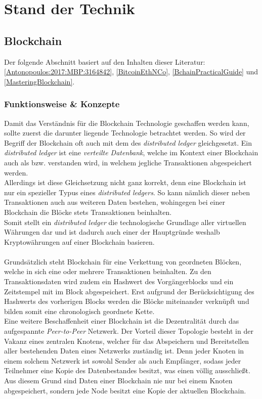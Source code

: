 \chapter{Stand der Technik}
\label{kap:Kapitel02}
%
       
%
\section{Blockchain}
Der folgende Abschnitt basiert auf den Inhalten dieser Literatur: \ref{Antonopoulos:2017:MBP:3164842}, \ref{BitcoinEthNCo}, \ref{BchainPracticalGuide} und \ref{MasteringBlockchain}. 

\subsection{Funktionsweise \& Konzepte}
Damit das Verständnis für die Blockchain Technologie geschaffen werden kann, sollte zuerst die darunter liegende Technologie betrachtet werden. 
So wird der Begriff der Blockchain oft auch mit dem des \textit{distributed ledger} gleichgesetzt. Ein \textit{distributed ledger} ist eine \textit{verteilte Datenbank}, welche im Kontext einer Blockchain auch als  bzw.  \cite{DL:bafin} verstanden wird, in welchem jegliche Transaktionen abgespeichert werden.\\
Allerdings ist diese Gleichsetzung nicht ganz korrekt, denn eine Blockchain ist nur ein spezieller Typus eines \textit{distributed ledgers}. So kann nämlich dieser neben Transaktionen auch aus weiteren Daten bestehen, wohingegen bei einer Blockchain die Blöcke stets Transaktionen beinhalten. \\
Somit stellt ein \textit{distributed ledger} die technologische Grundlage aller virtuellen Währungen dar und ist dadurch auch einer der Hauptgründe weshalb Kryptowährungen auf einer Blockchain basieren.\\\\
Grundsätzlich steht Blockchain für eine Verkettung von geordneten Blöcken, welche in sich eine oder mehrere Transaktionen beinhalten. 
Zu den Transaktionsdaten wird zudem ein Hashwert des Vorgängerblocks und ein Zeitstempel mit im Block abgespeichert. Erst aufgrund der Berücksichtigung des Hashwerts des vorherigen Blocks werden die Blöcke miteinander verknüpft und bilden somit eine chronologisch geordnete Kette.\\
Eine weitere Beschaffenheit einer Blockchain ist die Dezentralität durch das aufgespannte \textit{Peer-to-Peer} Netzwerk. Der Vorteil dieser Topologie besteht in der Vakanz eines zentralen Knotens, welcher für das Abspeichern und Bereitstellen aller bestehenden Daten eines Netzwerks zuständig ist. Denn jeder Knoten in einem solchem Netzwerk ist sowohl Sender als auch Empfänger, sodass jeder Teilnehmer eine Kopie des Datenbestandes besitzt, was einen  völlig ausschließt. Aus diesem Grund sind Daten einer Blockchain nie nur bei einem Knoten abgespeichert, sondern jede Node besitzt eine Kopie der aktuellen Blockchain.\\
